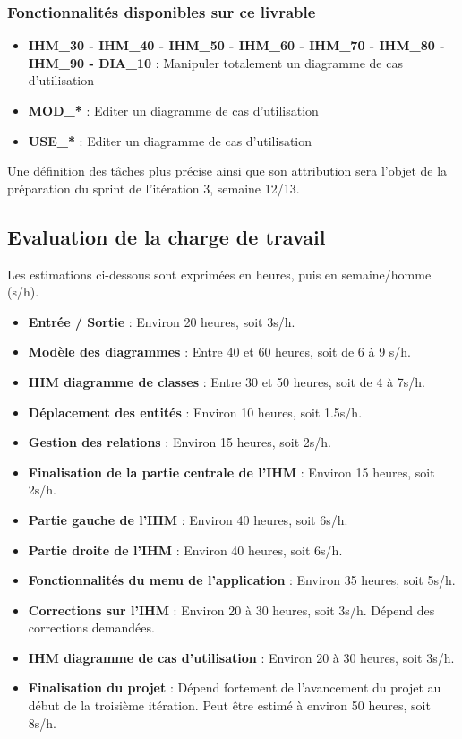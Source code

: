 \documentclass[hidelinks, 10pt,a4paper]{article}
\begin{document}
\subsubsection{Fonctionnalités disponibles sur ce livrable}
\begin{itemize}
  \item \textbf{IHM\_30 - IHM\_40 - IHM\_50 - IHM\_60 - IHM\_70 - IHM\_80 - IHM\_90 - DIA\_10} : Manipuler totalement un diagramme de cas d'utilisation
  \item \textbf{MOD\_*} : Editer un diagramme de cas d'utilisation
  \item \textbf{USE\_*} : Editer un diagramme de cas d'utilisation
\end{itemize}

Une définition des tâches plus précise ainsi que son attribution sera l'objet de la
préparation du sprint de l'itération 3, semaine 12/13.

\subsection{Evaluation de la charge de travail}

Les estimations ci-dessous sont exprimées en heures, puis en semaine/homme (s/h).
\begin{itemize}
\item \textbf{Entrée / Sortie} : Environ 20 heures, soit 3s/h.
\item \textbf{Modèle des diagrammes} : Entre 40 et 60 heures, soit de 6 à 9 s/h.
\item \textbf{IHM diagramme de classes} : Entre 30 et 50 heures, soit de 4 à 7s/h.
\item \textbf{Déplacement des entités} : Environ 10 heures, soit 1.5s/h.
\item \textbf{Gestion des relations} : Environ 15 heures, soit 2s/h.
\item \textbf{Finalisation de la partie centrale de l'IHM} : Environ 15 heures, soit 2s/h.
\item \textbf{Partie gauche de l'IHM} : Environ 40 heures, soit 6s/h.
\item \textbf{Partie droite de l'IHM} : Environ 40 heures, soit 6s/h.
\item \textbf{Fonctionnalités du menu de l'application} : Environ 35 heures, soit 5s/h.
\item \textbf{Corrections sur l'IHM} : Environ 20 à 30 heures, soit 3s/h.
Dépend des corrections demandées.
\item \textbf{IHM diagramme de cas d'utilisation} : Environ 20 à 30 heures, soit 3s/h.
\item \textbf{Finalisation du projet} : Dépend fortement de l'avancement
du projet au début de la troisième itération. Peut être estimé à environ 50 heures,
soit 8s/h.
\end{itemize}
\end{document}
